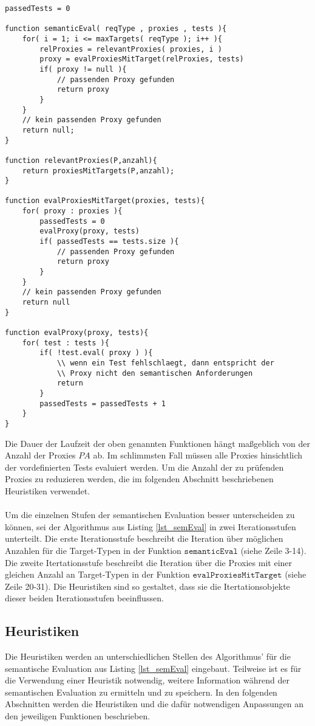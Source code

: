 \documentclass[a4paper,12pt]{article}
\begin{document}
\begin{lstlisting}[style = pseudo, caption = Semantische Evaluation ohne Heuristiken, captionpos = b, label = lst_semEval]
passedTests = 0

function semanticEval( reqType , proxies , tests ){
	for( i = 1; i <= maxTargets( reqType ); i++ ){
		relProxies = relevantProxies( proxies, i )
		proxy = evalProxiesMitTarget(relProxies, tests)	
		if( proxy != null ){
			// passenden Proxy gefunden
			return proxy
		}
	}
	// kein passenden Proxy gefunden
	return null;
}

function relevantProxies(P,anzahl){
	return proxiesMitTargets(P,anzahl);
}

function evalProxiesMitTarget(proxies, tests){
	for( proxy : proxies ){
		passedTests = 0
		evalProxy(proxy, tests)
		if( passedTests == tests.size ){
			// passenden Proxy gefunden
			return proxy
		}
	}
	// kein passenden Proxy gefunden
	return null
}

function evalProxy(proxy, tests){
	for( test : tests ){
		if( !test.eval( proxy ) ){
			\\ wenn ein Test fehlschlaegt, dann entspricht der 
			\\ Proxy nicht den semantischen Anforderungen
			return
		}
		passedTests = passedTests + 1
	}
}
\end{lstlisting}
Die Dauer der Laufzeit der oben genannten Funktionen hängt maßgeblich von der Anzahl der Proxies $\mathit{PA}$ ab. Im schlimmsten Fall müssen alle Proxies hinsichtlich der vordefinierten Tests evaluiert werden. Um die Anzahl der zu prüfenden Proxies zu reduzieren werden, die im folgenden Abschnitt beschriebenen Heuristiken verwendet.
\\\\
Um die einzelnen Stufen der semantischen Evaluation besser unterscheiden zu können, sei der Algorithmus aus Listing \ref{lst_semEval} in zwei Iterationsstufen unterteilt. Die erste Iterationsstufe beschreibt die Iteration über möglichen Anzahlen für die Target-Typen in der Funktion $\texttt{semanticEval}$ (siehe Zeile 3-14). Die zweite Itertationsstufe beschreibt die Iteration über die Proxies mit einer gleichen Anzahl an Target-Typen in der Funktion $\texttt{evalProxiesMitTarget}$ (siehe Zeile 20-31). Die Heuristiken sind so gestaltet, dass sie die Itertationsobjekte dieser beiden Iterationsstufen beeinflussen.

\subsection{Heuristiken}
Die Heuristiken werden an unterschiedlichen Stellen des Algorithmus' für die semantische Evaluation aus Listing \ref{lst_semEval} eingebaut. Teilweise ist es für die Verwendung einer Heuristik notwendig, weitere Information während der semantischen Evaluation zu ermitteln und zu speichern. In den folgenden Abschnitten werden die Heuristiken und die dafür notwendigen Anpassungen an den jeweiligen Funktionen beschrieben.
\end{document}
